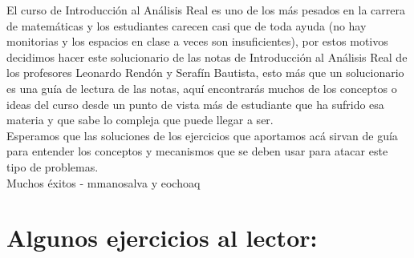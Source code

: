 
El curso de Introducción al Análisis Real es uno de los más pesados en la carrera de matemáticas y los estudiantes carecen casi que de toda ayuda (no hay monitorias y los espacios en clase a veces son insuficientes), por estos motivos decidimos hacer este solucionario de las notas de Introducción al Análisis Real de los profesores Leonardo Rendón y Serafín Bautista, esto más que un solucionario es una guía de lectura de las notas, aquí encontrarás muchos de los conceptos o ideas del curso desde un punto de vista más de estudiante que ha sufrido esa materia y que sabe lo compleja que puede llegar a ser.\\

Esperamos que las soluciones de los ejercicios que aportamos acá sirvan de guía para entender los conceptos y mecanismos que se deben usar para atacar este tipo de problemas.\\

Muchos éxitos - mmanosalva y eochoaq

\section{Algunos ejercicios al lector: }

